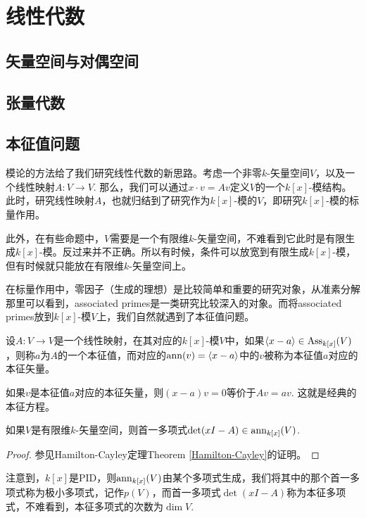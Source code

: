 \chapter{线性代数}
\section{矢量空间与对偶空间}

\section{张量代数}

\section{本征值问题}

模论的方法给了我们研究线性代数的新思路。考虑一个非零$k$-矢量空间$V$，以及一个线性映射$A:V\to V$. 那么，我们可以通过$x\cdot v=Av$定义$V$的一个$k[x]$-模结构。此时，研究线性映射$A$，也就归结到了研究作为$k[x]$-模的$V$，即研究$k[x]$-模的标量作用。

此外，在有些命题中，$V$需要是一个有限维$k$-矢量空间，不难看到它此时是有限生成$k[x]$-模。反过来并不正确。所以有时候，条件可以放宽到有限生成$k[x]$-模，但有时候就只能放在有限维$k$-矢量空间上。

在标量作用中，零因子（生成的理想）是比较简单和重要的研究对象，从准素分解那里可以看到，associated primes是一类研究比较深入的对象。而将associated primes放到$k[x]$-模$V$上，我们自然就遇到了本征值问题。

\begin{para}[本征值与本征矢量]
    设$A:V\to V$是一个线性映射，在其对应的$k[x]$-模$V$中，如果$\langle x-a\rangle\in \operatorname{Ass}_{k[x]}(V)$，则称$a$为$A$的一个本征值，而对应的$\operatorname{ann}(v)=\langle x-a\rangle$中的$v$被称为本征值$a$对应的本征矢量。
\end{para}

如果$v$是本征值$a$对应的本征矢量，则$(x-a)v=0$等价于$Av=av$. 这就是经典的本征方程。

\begin{lem}
    如果$V$是有限维$k$-矢量空间，则首一多项式$\det(xI-A)\in \operatorname{ann}_{k[x]}(V)$.
\end{lem}

\begin{proof}
    参见Hamilton-Cayley定理Theorem \ref{Hamilton-Cayley}的证明。
\end{proof}

注意到，$k[x]$是PID，则$\operatorname{ann}_{k[x]}(V)$由某个多项式生成，我们将其中的那个首一多项式称为极小多项式，记作$p(V)$，而首一多项式$\det(xI-A)$称为本征多项式，不难看到，本征多项式的次数为$\dim V$.

